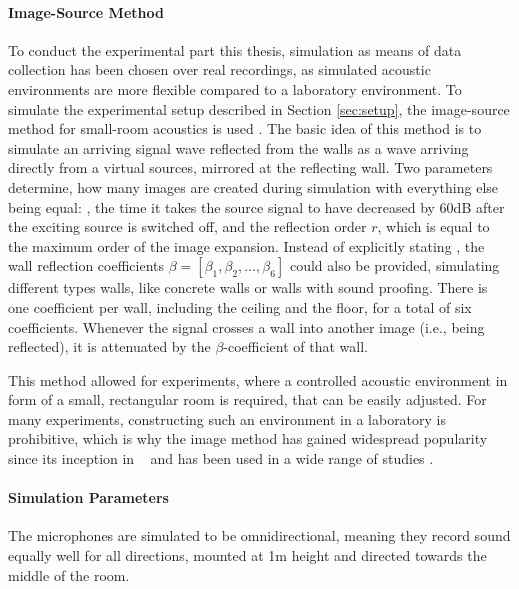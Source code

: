 \paragraph{Image-Source Method}
To conduct the experimental part this thesis, simulation as means of data collection has been chosen over real recordings, as simulated acoustic environments are more flexible compared to a laboratory environment. To simulate the experimental setup  described in Section \ref{sec:setup}, the image-source method for small-room acoustics is used \cite{Allen1979}. The basic idea of this method is to simulate an arriving signal wave reflected from the walls as a wave arriving directly from a virtual sources, mirrored at the reflecting wall. Two parameters determine, how many images are created during simulation with everything else being equal: \Tsixty, the time it takes the source signal to have decreased by 60dB after the exciting source is switched off, and the reflection order $r$, which is equal to the maximum order of the image expansion. Instead of explicitly stating \Tsixty, the wall reflection coefficients $\beta = [\beta_1, \beta_2,\dots,\beta_6]$ could also be provided, simulating different types walls, like concrete walls or walls with sound proofing. There is one coefficient per wall, including the ceiling and the floor, for a total of six coefficients. Whenever the signal crosses a wall into another image (i.e., being reflected), it is attenuated by the $\beta$-coefficient of that wall. 


This method allowed for experiments, where a controlled acoustic environment in form of a small, rectangular room is required, that can be easily adjusted. For many experiments, constructing such an environment in a laboratory is prohibitive, which is why the image method has gained widespread popularity since its inception in \citeyear{Allen1979}~\cite{Allen1979} and has been used in a wide range of studies \cite{Champagne1996}.

\paragraph{Simulation Parameters}
The microphones are simulated to be omnidirectional, meaning they record sound equally well for all directions, mounted at 1m height and directed towards the middle of the room.